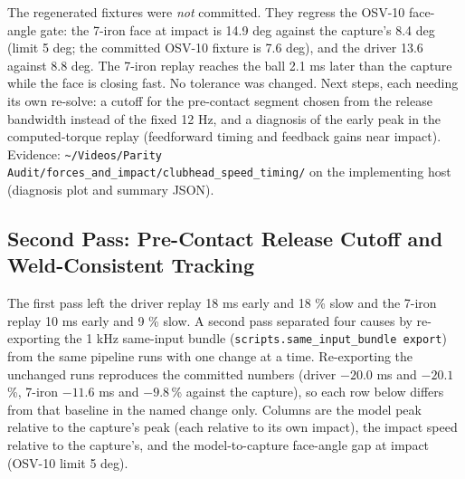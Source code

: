 \documentclass[11pt,a4paper]{article}
\begin{document}
The regenerated fixtures were \emph{not} committed. They regress the OSV-10
face-angle gate: the 7-iron face at impact is 14.9 deg against the capture's
8.4 deg (limit 5 deg; the committed OSV-10 fixture is 7.6 deg), and the
driver 13.6 against 8.8 deg. The 7-iron replay reaches the ball 2.1 ms later
than the capture while the face is closing fast. No tolerance was changed.
Next steps, each needing its own re-solve: a cutoff for the pre-contact
segment chosen from the release bandwidth instead of the fixed 12 Hz, and a
diagnosis of the early peak in the computed-torque replay (feedforward
timing and feedback gains near impact). Evidence:
\texttt{\textasciitilde/Videos/Parity Audit/forces\_and\_impact/clubhead\_speed\_timing/}
on the implementing host (diagnosis plot and summary JSON).

\subsection{Second Pass: Pre-Contact Release Cutoff and Weld-Consistent Tracking}
\label{sec:gcv20_second_pass}
The first pass left the driver replay 18 ms early and 18 \% slow and the
7-iron replay 10 ms early and 9 \% slow. A second pass separated four causes
by re-exporting the 1 kHz same-input bundle
(\texttt{scripts.same\_input\_bundle export}) from the same pipeline runs with
one change at a time. Re-exporting the unchanged runs reproduces the
committed numbers (driver $-20.0$ ms and $-20.1$\,\%, 7-iron $-11.6$ ms and
$-9.8$\,\% against the capture), so each row below differs from that
baseline in the named change only. Columns are the model peak relative to
the capture's peak (each relative to its own impact), the impact speed
relative to the capture's, and the model-to-capture face-angle gap at impact
(OSV-10 limit 5 deg).
\end{document}
